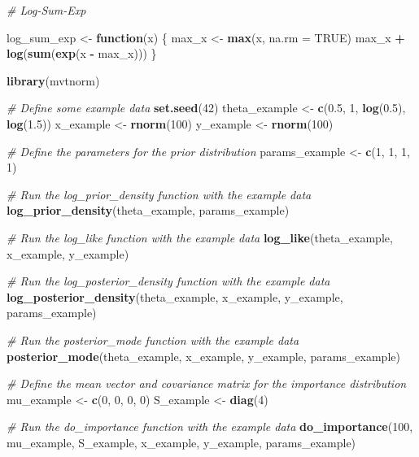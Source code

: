 \documentclass[
]{article}
\newenvironment{Shaded}{\begin{snugshade}}{\end{snugshade}}
\newcommand{\AttributeTok}[1]{\textcolor[rgb]{0.13,0.29,0.53}{#1}}
\newcommand{\CommentTok}[1]{\textcolor[rgb]{0.56,0.35,0.01}{\textit{#1}}}
\newcommand{\ConstantTok}[1]{\textcolor[rgb]{0.56,0.35,0.01}{#1}}
\newcommand{\ControlFlowTok}[1]{\textcolor[rgb]{0.13,0.29,0.53}{\textbf{#1}}}
\newcommand{\DecValTok}[1]{\textcolor[rgb]{0.00,0.00,0.81}{#1}}
\newcommand{\FloatTok}[1]{\textcolor[rgb]{0.00,0.00,0.81}{#1}}
\newcommand{\FunctionTok}[1]{\textcolor[rgb]{0.13,0.29,0.53}{\textbf{#1}}}
\newcommand{\NormalTok}[1]{#1}
\newcommand{\OtherTok}[1]{\textcolor[rgb]{0.56,0.35,0.01}{#1}}
\newcommand{\SpecialCharTok}[1]{\textcolor[rgb]{0.81,0.36,0.00}{\textbf{#1}}}
\begin{document}
\begin{Shaded}
\begin{Highlighting}[]
\CommentTok{\# Log{-}Sum{-}Exp}

\NormalTok{log\_sum\_exp }\OtherTok{\textless{}{-}} \ControlFlowTok{function}\NormalTok{(x) \{}
\NormalTok{  max\_x }\OtherTok{\textless{}{-}} \FunctionTok{max}\NormalTok{(x, }\AttributeTok{na.rm =} \ConstantTok{TRUE}\NormalTok{) }
\NormalTok{  max\_x }\SpecialCharTok{+} \FunctionTok{log}\NormalTok{(}\FunctionTok{sum}\NormalTok{(}\FunctionTok{exp}\NormalTok{(x }\SpecialCharTok{{-}}\NormalTok{ max\_x)))}
\NormalTok{\}}


\FunctionTok{library}\NormalTok{(mvtnorm)}

\CommentTok{\# Define some example data}
\FunctionTok{set.seed}\NormalTok{(}\DecValTok{42}\NormalTok{)}
\NormalTok{theta\_example }\OtherTok{\textless{}{-}} \FunctionTok{c}\NormalTok{(}\FloatTok{0.5}\NormalTok{, }\DecValTok{1}\NormalTok{, }\FunctionTok{log}\NormalTok{(}\FloatTok{0.5}\NormalTok{), }\FunctionTok{log}\NormalTok{(}\FloatTok{1.5}\NormalTok{))}
\NormalTok{x\_example }\OtherTok{\textless{}{-}} \FunctionTok{rnorm}\NormalTok{(}\DecValTok{100}\NormalTok{)}
\NormalTok{y\_example }\OtherTok{\textless{}{-}} \FunctionTok{rnorm}\NormalTok{(}\DecValTok{100}\NormalTok{)}

\CommentTok{\# Define the parameters for the prior distribution}
\NormalTok{params\_example }\OtherTok{\textless{}{-}} \FunctionTok{c}\NormalTok{(}\DecValTok{1}\NormalTok{, }\DecValTok{1}\NormalTok{, }\DecValTok{1}\NormalTok{, }\DecValTok{1}\NormalTok{)}

\CommentTok{\# Run the log\_prior\_density function with the example data}
\FunctionTok{log\_prior\_density}\NormalTok{(theta\_example, params\_example)}

\CommentTok{\# Run the log\_like function with the example data}
\FunctionTok{log\_like}\NormalTok{(theta\_example, x\_example, y\_example)}

\CommentTok{\# Run the log\_posterior\_density function with the example data}
\FunctionTok{log\_posterior\_density}\NormalTok{(theta\_example, x\_example, y\_example, params\_example)}

\CommentTok{\# Run the posterior\_mode function with the example data}
\FunctionTok{posterior\_mode}\NormalTok{(theta\_example, x\_example, y\_example, params\_example)}

\CommentTok{\# Define the mean vector and covariance matrix for the importance distribution}
\NormalTok{mu\_example }\OtherTok{\textless{}{-}} \FunctionTok{c}\NormalTok{(}\DecValTok{0}\NormalTok{, }\DecValTok{0}\NormalTok{, }\DecValTok{0}\NormalTok{, }\DecValTok{0}\NormalTok{)}
\NormalTok{S\_example }\OtherTok{\textless{}{-}} \FunctionTok{diag}\NormalTok{(}\DecValTok{4}\NormalTok{)}

\CommentTok{\# Run the do\_importance function with the example data}
\FunctionTok{do\_importance}\NormalTok{(}\DecValTok{100}\NormalTok{, mu\_example, S\_example, x\_example, y\_example, params\_example)}
\end{Highlighting}
\end{Shaded}
\end{document}

